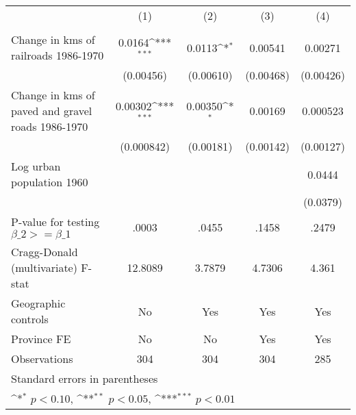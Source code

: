 {
\def\sym#1{\ifmmode^{#1}\else\(^{#1}\)\fi}
\begin{tabular}{l*{4}{c}}
\hline\hline
                &\multicolumn{1}{c}{(1)}&\multicolumn{1}{c}{(2)}&\multicolumn{1}{c}{(3)}&\multicolumn{1}{c}{(4)}\\
                &\multicolumn{1}{c}{}&\multicolumn{1}{c}{}&\multicolumn{1}{c}{}&\multicolumn{1}{c}{}\\
\hline
Change in kms of railroads 1986-1970&   0.0164\sym{***}&   0.0113\sym{*}  &  0.00541         &  0.00271         \\
                &(0.00456)         &(0.00610)         &(0.00468)         &(0.00426)         \\
[1em]
Change in kms of paved and gravel roads 1986-1970&  0.00302\sym{***}&  0.00350\sym{*}  &  0.00169         & 0.000523         \\
                &(0.000842)         &(0.00181)         &(0.00142)         &(0.00127)         \\
[1em]
Log urban population 1960&                  &                  &                  &   0.0444         \\
                &                  &                  &                  & (0.0379)         \\
\hline
P-value for testing $\beta\_{2} >= \beta\_{1}$&    .0003         &    .0455         &    .1458         &    .2479         \\
Cragg-Donald (multivariate) F-stat&  12.8089         &   3.7879         &   4.7306         &    4.361         \\
Geographic controls&       No         &      Yes         &      Yes         &      Yes         \\
Province FE     &       No         &       No         &      Yes         &      Yes         \\
Observations    &      304         &      304         &      304         &      285         \\
\hline\hline
\multicolumn{5}{l}{\footnotesize Standard errors in parentheses}\\
\multicolumn{5}{l}{\footnotesize \sym{*} \(p<0.10\), \sym{**} \(p<0.05\), \sym{***} \(p<0.01\)}\\
\end{tabular}
}
